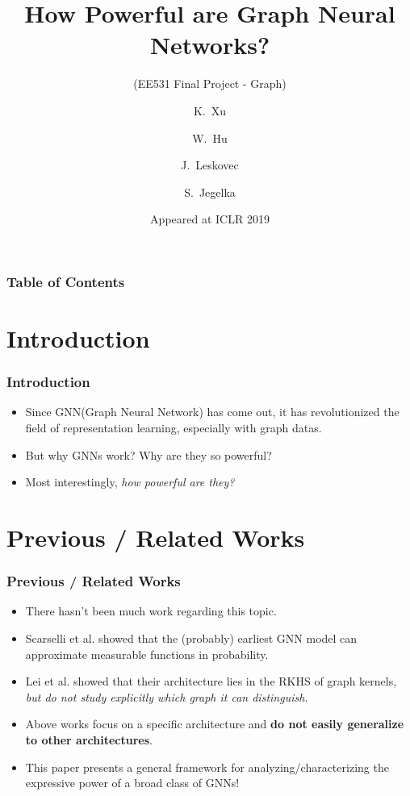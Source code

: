\documentclass[handout]{beamer}
\title[How Powerful are Graph Neural Networks?]
{How Powerful are Graph Neural Networks?}
\subtitle{(EE531 Final Project - Graph)}
\author[Junghyun Lee]
{K.~Xu\inst{1} \and W.~Hu\inst{2} \and J.~Leskovec\inst{2} \and S.~Jegelka\inst{1}}
\institute[KAIST]
{
	\inst{1}%
	MIT
	
	\inst{2}%
	Stanford University
}
\date[ICLR 2019]
{Appeared at ICLR 2019}
\begin{document}
\frame{\titlepage}


\begin{frame}
\frametitle{Table of Contents}
\tableofcontents
\end{frame}

\section{Introduction}

\begin{frame}
\frametitle{Introduction}

\begin{itemize}
    \item Since GNN(Graph Neural Network) has come out, it has revolutionized the field of representation learning, especially with graph datas. \pause
    \item But why GNNs work? Why are they so powerful? \pause
    \item Most interestingly, {\it how powerful are they?}
\end{itemize}
\end{frame}


\section{Previous / Related Works}

\begin{frame}
\frametitle{Previous / Related Works}

\begin{itemize}
    \item There hasn't been much work regarding this topic.\pause
    \item Scarselli et al. showed that the (probably) earliest GNN model can approximate measurable functions in probability.\pause
    \item Lei et al. showed that their architecture lies in the RKHS of graph kernels, {\it but do not study explicitly which graph it can distinguish.}\pause
    \item Above works focus on a specific architecture and {\bf do not easily generalize to other architectures}.\pause
    \item This paper presents a \alert{general framework} for analyzing/characterizing the expressive power of a \alert{broad class of GNNs}!
\end{itemize}
\end{frame}
\end{document}
